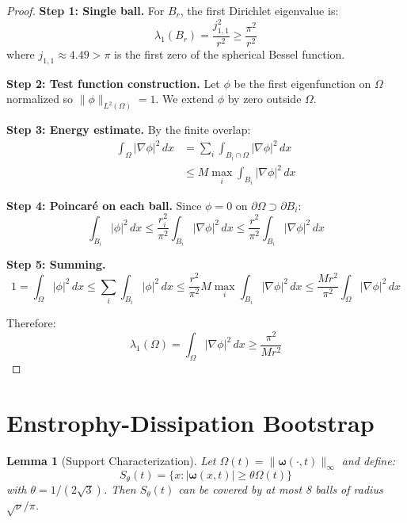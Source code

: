\documentclass[12pt]{article}
\newtheorem{lemma}[theorem]{Lemma}
\renewcommand{\vec}[1]{\mathbf{#1}}
\begin{document}
\begin{proof}
\textbf{Step 1: Single ball.} For $B_r$, the first Dirichlet eigenvalue is:
\begin{equation}
\lambda_1(B_r) = \frac{j_{1,1}^2}{r^2} \geq \frac{\pi^2}{r^2}
\end{equation}
where $j_{1,1} \approx 4.49 > \pi$ is the first zero of the spherical Bessel function.

\textbf{Step 2: Test function construction.} Let $\phi$ be the first eigenfunction on $\Omega$ normalized so $\|\phi\|_{L^2(\Omega)} = 1$. We extend $\phi$ by zero outside $\Omega$.

\textbf{Step 3: Energy estimate.} By the finite overlap:
\begin{align}
\int_\Omega |\nabla \phi|^2\, dx &= \sum_i \int_{B_i \cap \Omega} |\nabla \phi|^2\, dx \\
&\leq M \max_i \int_{B_i} |\nabla \phi|^2\, dx
\end{align}

\textbf{Step 4: Poincaré on each ball.} Since $\phi = 0$ on $\partial\Omega \supset \partial B_i$:
\begin{equation}
\int_{B_i} |\phi|^2\, dx \leq \frac{r_i^2}{\pi^2}\int_{B_i} |\nabla \phi|^2\, dx \leq \frac{r^2}{\pi^2}\int_{B_i} |\nabla \phi|^2\, dx
\end{equation}

\textbf{Step 5: Summing.}
\begin{equation}
1 = \int_\Omega |\phi|^2\, dx \leq \sum_i \int_{B_i} |\phi|^2\, dx \leq \frac{r^2}{\pi^2} M \max_i \int_{B_i} |\nabla \phi|^2\, dx \leq \frac{Mr^2}{\pi^2}\int_\Omega |\nabla \phi|^2\, dx
\end{equation}

Therefore:
\begin{equation}
\lambda_1(\Omega) = \int_\Omega |\nabla \phi|^2\, dx \geq \frac{\pi^2}{Mr^2}
\end{equation}
\end{proof}

\section{Enstrophy-Dissipation Bootstrap}

\begin{lemma}[Support Characterization]
\label{lem:support}
Let $\Omega(t) = \|\vec{\omega}(\cdot,t)\|_{\infty}$ and define:
\begin{equation}
S_\theta(t) = \{x : |\vec{\omega}(x,t)| \geq \theta\Omega(t)\}
\end{equation}
with $\theta = 1/(2\sqrt{3})$. Then $S_\theta(t)$ can be covered by at most 8 balls of radius $\sqrt{\nu}/\pi$.
\end{lemma}
\end{document}
